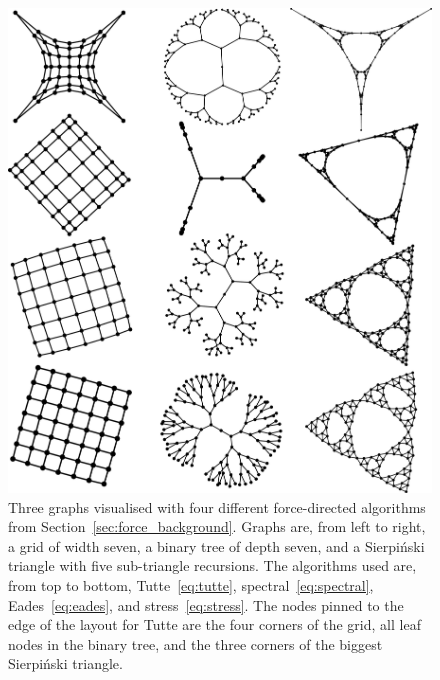 \begin{figure}
  \centering
  \includegraphics[width=1.03\textwidth]{stress/force.pdf}
  \caption[A gallery of node layout methods]{
  Three graphs visualised with four different force-directed algorithms from Section~\ref{sec:force_background}. Graphs are, from left to right, a grid of width seven, a binary tree of depth seven, and a Sierpi\'nski triangle \citep{Sierpinski1915} with five sub-triangle recursions.
  The algorithms used are, from top to bottom, Tutte~\eqref{eq:tutte}, spectral~\eqref{eq:spectral}, Eades~\eqref{eq:eades}, and stress~\eqref{eq:stress}.
  The nodes pinned to the edge of the layout for Tutte are the four corners of the grid, all leaf nodes in the binary tree, and the three corners of the biggest Sierpi\'nski triangle.}
  \label{fig:misc_force_layouts}
\end{figure}

